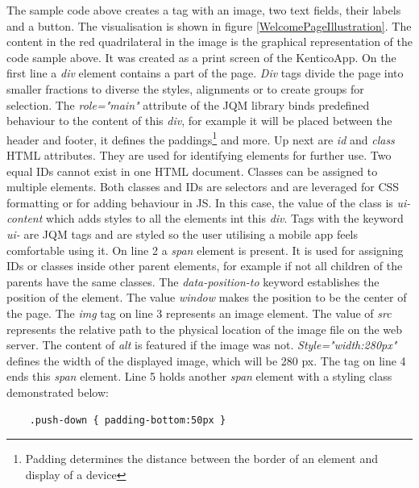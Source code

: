 The sample code above creates a tag with an image, two text fields, their labels and a button. The visualisation is shown in figure \ref{WelcomePageIllustration}. The content in the red quadrilateral in the image is the graphical representation of the code sample above. It was created as a print screen of the KenticoApp. On the first line a \textit{div} element contains a part of the page. \textit{Div} tags divide the page into smaller fractions to diverse the styles, alignments or to create groups for selection. The \textit{role="main"} attribute of the JQM library binds predefined behaviour to the content of this \textit{div}, for example it will be placed between the header and footer, it defines the paddings\footnote{Padding determines the distance between the border of an element and display of a device} and more. Up next are \textit{id} and \textit{class} HTML attributes. They are used for identifying elements for further use. Two equal IDs cannot exist in one HTML document. Classes can be assigned to multiple elements. Both classes and IDs are selectors and are leveraged for CSS formatting or for adding behaviour in JS. In this case, the value of the class is \textit{ui-content} which adds styles to all the elements int this \textit{div}. Tags with the keyword \textit{ui-} are JQM tags and are styled so the user utilising a mobile app feels comfortable using it. On line 2 a \textit{span} element is present. It is used for assigning IDs or classes inside other parent elements, for example if not all children of the parents have the same classes. The \textit{data-position-to} keyword establishes the position of the element. The value \textit{window} makes the position to be the center of the page. The \textit{img} tag on line 3 represents an image element. The value of \textit{src} represents the relative path to the physical location of the image file on the web server. The content of \textit{alt} is featured if the image was not. \textit{Style="width:280px"} defines the width of the displayed image, which will be 280 px. The tag on line 4 ends this \textit{span} element. Line 5 holds another \textit{span} element with a styling class demonstrated below:
\lstset{style=sharpc, numbers=none}
\begin{lstlisting}
	.push-down { padding-bottom:50px }
\end{lstlisting}
